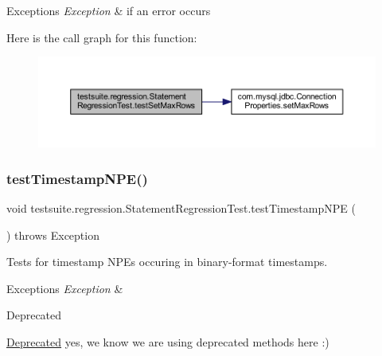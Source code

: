 \begin{DoxyExceptions}{Exceptions}
{\em Exception} & if an error occurs \\
\hline
\end{DoxyExceptions}
Here is the call graph for this function\+:
\nopagebreak
\begin{figure}[H]
\begin{center}
\leavevmode
\includegraphics[width=350pt]{classtestsuite_1_1regression_1_1_statement_regression_test_a81fe072b5269fee8c61a3391538282c2_cgraph}
\end{center}
\end{figure}
\mbox{\label{classtestsuite_1_1regression_1_1_statement_regression_test_adddbda10c165cfaf7d3ae1266e7a66ab}} 
\subsubsection{\texorpdfstring{test\+Timestamp\+N\+P\+E()}{testTimestampNPE()}}
{\footnotesize\ttfamily void testsuite.\+regression.\+Statement\+Regression\+Test.\+test\+Timestamp\+N\+PE (\begin{DoxyParamCaption}{ }\end{DoxyParamCaption}) throws Exception}

Tests for timestamp N\+P\+Es occuring in binary-\/format timestamps.


\begin{DoxyExceptions}{Exceptions}
{\em Exception} & \\
\hline
\end{DoxyExceptions}
\begin{DoxyRefDesc}{Deprecated}
\item[\mbox{\hyperlink{deprecated__deprecated000027}{Deprecated}}]yes, we know we are using deprecated methods here \+:) \end{DoxyRefDesc}
\mbox{\label{classtestsuite_1_1regression_1_1_statement_regression_test_a7695fd8186a02b78d65dc3af0db02e34}} 
